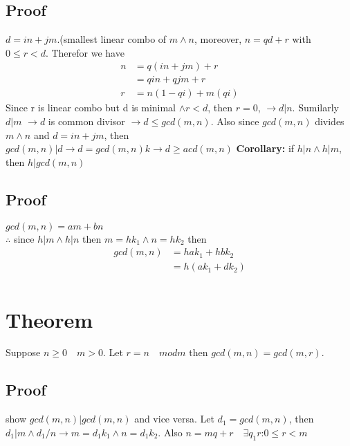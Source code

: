 \subsection{Proof}
$d=in+jm$.(smallest linear combo of $m \land n$, moreover, $n=qd+r$ with  $0 \leq r < d$. Therefor we have 
\begin{align*}
n&=q(in+jm)+r\\
&=qin+qjm+r\\
r&=n(1-qi)+m(qi)
\end{align*}
Since r is linear combo but d is minimal $\land r<d$, then $r=0$, $\rightarrow d|n $. Sumilarly $d|m$ $\rightarrow d$ is common divisor $\rightarrow d \leq gcd(m,n)$. Also since $gcd(m,n)$ divides $m \land n$ and $d=in+jm$, then $gcd(m,n)|d \rightarrow d=gcd(m,n)k \rightarrow d \geq acd(m,n)$
\textbf{Corollary:} if $h|n \land h|m$, then $h|gcd(m,n)$ 

\subsection{Proof}
$gcd(m,n) = am+bn$\\
$\therefore$ since $h|m \land h|n$ then $m=hk_1 \land n=hk_2$ then
\begin{align*}
gcd(m,n)&= hak_1 + hbk_2\\
&=h(ak_1+dk_2)\\
\end{align*}

\section{Theorem}
Suppose $n \geq 0 \quad m>0 $. Let $r=n \quad mod m$ then $gcd(m,n)=gcd(m,r).$ 
\subsection{Proof}
show $gcd(m,n)|gcd(m,n)$ and vice versa. Let $d_1 = gcd(m,n)$, then $d_1|m \land d_1/n \rightarrow m=d_1k_1 \land n=d_1k_2$. Also $n=mq+r \quad \exists q_1r$:$0\leq r <m$

